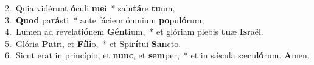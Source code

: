 {2.~}Quia vidérunt \textbf{ó}culi \textbf{me}i~* salu\textbf{tá}re \textbf{tu}um,\\
{3.~}\textbf{Quod} pa\textbf{rá}sti~* ante fáciem ómnium \textbf{po}pu\textbf{ló}rum,\\
{4.~}Lumen ad revelati\textbf{ó}nem \textbf{Gén}\textbf{ti}um,~* et glóriam plebis \textbf{tu}æ \textbf{Is}raël.\\
{5.~}Glória \textbf{Pa}tri, et \textbf{Fí}\textbf{li}o,~* et Spi\textbf{rí}tui \textbf{San}cto.\\
{6.~}Sicut erat in princípio, et \textbf{nunc}, et \textbf{sem}per,~* et in sǽcula sæcu\textbf{ló}rum. \textbf{A}men.\\
